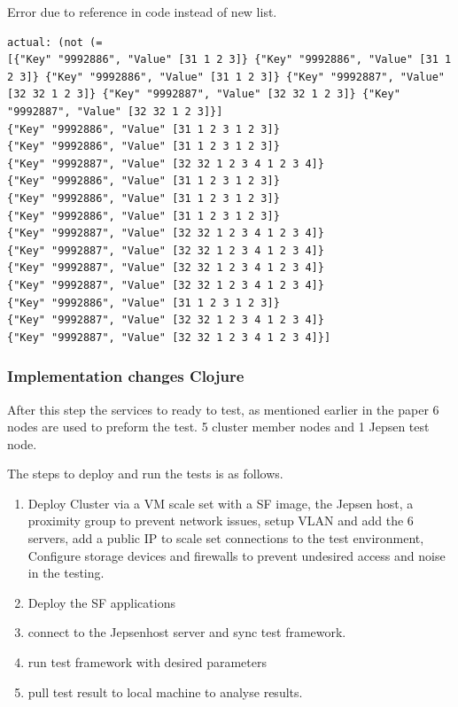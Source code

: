 \documentclass[a4paper,10pt,titlepage]{report}
\begin{document}
Error due to reference in code instead of new list.
\begin{lstlisting}
actual: (not (= 
[{"Key" "9992886", "Value" [31 1 2 3]} {"Key" "9992886", "Value" [31 1 2 3]} {"Key" "9992886", "Value" [31 1 2 3]} {"Key" "9992887", "Value" [32 32 1 2 3]} {"Key" "9992887", "Value" [32 32 1 2 3]} {"Key" "9992887", "Value" [32 32 1 2 3]}] 
{"Key" "9992886", "Value" [31 1 2 3 1 2 3]} 
{"Key" "9992886", "Value" [31 1 2 3 1 2 3]} 
{"Key" "9992887", "Value" [32 32 1 2 3 4 1 2 3 4]} 
{"Key" "9992886", "Value" [31 1 2 3 1 2 3]} 
{"Key" "9992886", "Value" [31 1 2 3 1 2 3]} 
{"Key" "9992886", "Value" [31 1 2 3 1 2 3]} 
{"Key" "9992887", "Value" [32 32 1 2 3 4 1 2 3 4]} 
{"Key" "9992887", "Value" [32 32 1 2 3 4 1 2 3 4]} 
{"Key" "9992887", "Value" [32 32 1 2 3 4 1 2 3 4]} 
{"Key" "9992887", "Value" [32 32 1 2 3 4 1 2 3 4]} 
{"Key" "9992886", "Value" [31 1 2 3 1 2 3]} 
{"Key" "9992887", "Value" [32 32 1 2 3 4 1 2 3 4]} 
{"Key" "9992887", "Value" [32 32 1 2 3 4 1 2 3 4]}]
\end{lstlisting}

     \subsubsection{Implementation changes Clojure}
    





    After this step the services to ready to test, as mentioned earlier in the paper 6 nodes are used to preform the test. 5 cluster member nodes and 1 Jepsen test node.

    The steps to deploy and run the tests is as follows.

    \begin{enumerate}
        \item Deploy Cluster via a VM scale set with a SF image, the Jepsen host, a proximity group to prevent network issues, setup VLAN and add the 6 servers, add a public IP to scale set connections to the test environment, Configure storage devices and firewalls to prevent undesired access and noise in the testing.
        \item Deploy the SF applications
        \item connect to the Jepsenhost server and sync test framework.
        \item run test framework with desired parameters
        \item pull test result to local machine to analyse results.
    \end{enumerate}
\end{document}

